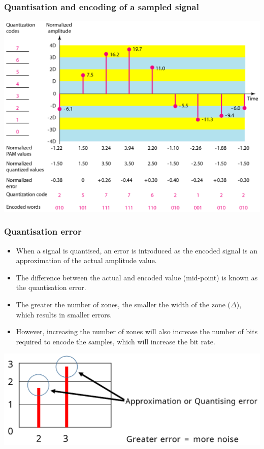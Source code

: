 \documentclass[11pt]{article}
\begin{document}
\subsubsection{Quantisation and encoding of a sampled signal}
\label{sec:org3b74900}
\begin{center}
\includegraphics[width=.9\linewidth]{./images/quantisation-and-encoding-result-of-a-sampled-signal.png}
\end{center}

 \newpage
\subsubsection{Quantisation error}
\label{sec:orgb1d592c}
\begin{itemize}
\item When a signal is quantised, an error is introduced as the encoded signal is an approximation of the actual amplitude value.
\item The difference between the actual and encoded value (mid-point) is known as the quantisation error.
\item The greater the number of zones, the smaller the width of the zone (\(\Delta\)), which results in smaller errors.
\item However, increasing the number of zones will also increase the number of bits required to encode the samples, which will increase the bit rate.
\end{itemize}

\begin{center}
\includegraphics[width=.9\linewidth]{./images/quantisation-error.png}
\end{center}
\end{document}
